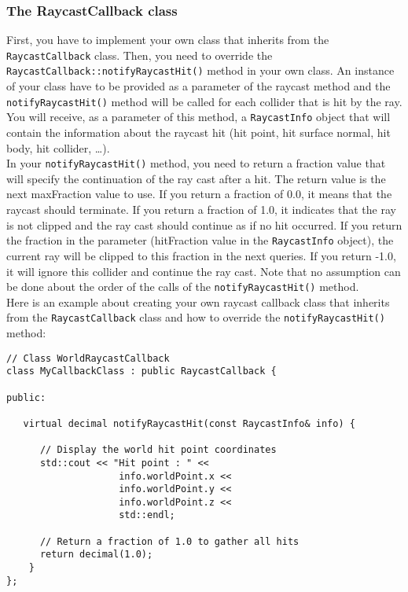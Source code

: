 \documentclass[a4paper,12pt]{article}
\begin{document}
    \subsubsection{The RaycastCallback class}

    First, you have to implement your own class that inherits from the \texttt{RaycastCallback} class. Then, you need to override the
    \texttt{RaycastCallback::notifyRaycastHit()} method in your own class. An instance of your class have to be provided as a parameter
    of the raycast method and the \texttt{notifyRaycastHit()} method will be called for each collider that is hit by the ray. You will receive, as a parameter
    of this method, a \texttt{RaycastInfo} object that will contain the information about the raycast hit (hit point, hit surface normal, hit body, hit collider, \dots). \\

    In your \texttt{notifyRaycastHit()} method, you need to return a fraction value that will specify the continuation of the ray cast after a hit.
    The return value is the next maxFraction value to use. If you return a fraction of 0.0, it means that the raycast should terminate. If you return a
    fraction of 1.0, it indicates that the ray is not clipped and the ray cast should continue as if no hit occurred. If you return the fraction in the
    parameter (hitFraction value in the \texttt{RaycastInfo} object), the current ray will be clipped to this fraction in the next queries. If you return -1.0, it will
    ignore this collider and continue the ray cast. Note that no assumption can be done about the order of the calls of the \texttt{notifyRaycastHit()} method. \\

    Here is an example about creating your own raycast callback class that inherits from the \texttt{RaycastCallback} class and how to override the
    \texttt{notifyRaycastHit()} method: \\

    \begin{lstlisting}
// Class WorldRaycastCallback
class MyCallbackClass : public RaycastCallback {

public:

   virtual decimal notifyRaycastHit(const RaycastInfo& info) {

      // Display the world hit point coordinates
      std::cout << "Hit point : " <<
                    info.worldPoint.x <<
                    info.worldPoint.y <<
                    info.worldPoint.z <<
                    std::endl;

      // Return a fraction of 1.0 to gather all hits
      return decimal(1.0);
    }
};
  \end{lstlisting}
\end{document}
